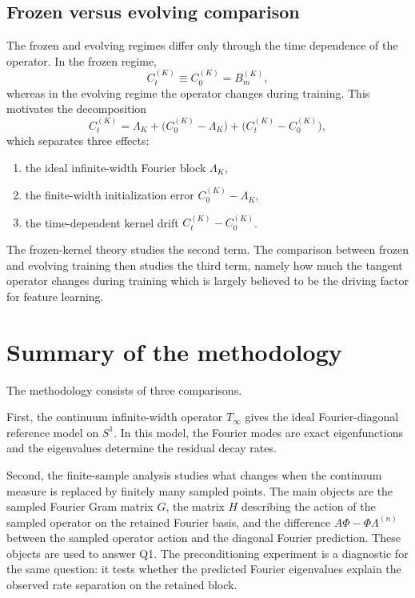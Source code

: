 \subsection{Frozen versus evolving comparison}

The frozen and evolving regimes differ only through the time dependence of the operator. In
the frozen regime,
\[
	C_t^{(K)}\equiv C_0^{(K)}=B_m^{(K)},
\]
whereas in the evolving regime the operator changes during training. This motivates the
decomposition
\begin{equation}
	C_t^{(K)}
	=
	\Lambda_K
	+
	\bigl(C_0^{(K)}-\Lambda_K\bigr)
	+
	\bigl(C_t^{(K)}-C_0^{(K)}\bigr),
	\label{eq:method-operator-decomposition}
\end{equation}
which separates three effects:

\begin{enumerate}
	\item the ideal infinite-width Fourier block \(\Lambda_K\),
	\item the finite-width initialization error \(C_0^{(K)}-\Lambda_K\),
	\item the time-dependent kernel drift \(C_t^{(K)}-C_0^{(K)}\).
\end{enumerate}

The frozen-kernel theory studies the second term. The comparison between frozen
and evolving training then studies the third term, namely how much the tangent
operator changes during training which is largely believed to be the driving factor for feature learning.

\section{Summary of the methodology}

The methodology consists of three comparisons.

First, the continuum infinite-width operator \(T_\infty\) gives the ideal
Fourier-diagonal reference model on \(S^1\). In this model, the Fourier modes
are exact eigenfunctions and the eigenvalues determine the residual decay rates.

Second, the finite-sample analysis studies what changes when the continuum
measure is replaced by finitely many sampled points. The main objects are the
sampled Fourier Gram matrix \(G\), the matrix \(H\) describing the action of the
sampled operator on the retained Fourier basis, and the difference
\(A\Phi-\Phi\Lambda^{(n)}\) between the sampled operator action and the diagonal
Fourier prediction. These objects are used to answer Q1. The preconditioning
experiment is a diagnostic for the same question: it tests whether the predicted
Fourier eigenvalues explain the observed rate separation on the retained block.

